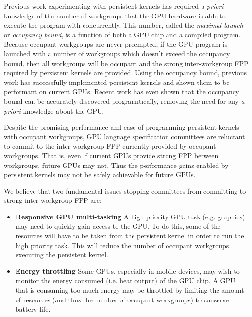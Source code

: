 \documentclass[nocopyrightspace]{sigplanconf-pldi16}
\begin{document}
Previous work experimenting with persistent kernels has required
\emph{a priori} knowledge of the number of workgroups that the GPU
hardware is able to execute the program with concurrently. This
number, called the \emph{maximal launch} or \emph{occupancy bound}, is
a function of both a GPU chip and a compiled program. Because occupant
workgroups are never preempted, if the GPU program is launched with a
number of workgroups which doesn't exceed the occupancy bound, then
all workgroups will be occupant and the strong inter-workgroup FPP
required by persistent kernels are provided. Using the occupancy
bound, previous work has successfully implemented persistent kernels
and shown them to be performant on current GPUs. Recent work has even
shown that the occupancy bound can be accurately discovered
programitically, removing the need for any \emph{a priori} knowledge
about the GPU.

Despite the promising performance and ease of programming persistent
kernels with occupant workgroups, GPU language specification
committees are reluctant to commit to the inter-workgroup FPP
currently provided by occupant workgroups. That is, even if current
GPUs provide strong FPP between workgroups, future GPUs may not. Thus
the performance gains enabled by persistent kernels may not be
safely achievable for future GPUs.

We believe that two fundamental issues stopping committees from
committing to strong inter-workgroup FPP are:

\begin{itemize}
\item {\bf Responsive GPU multi-tasking} A high priority GPU task
  (e.g. graphics) may need to quickly gain access to the GPU. To do
  this, some of the resources will have to be taken from the
  persistent kernel in order to run the high priority task. This will
  reduce the number of occupant workgroups executing the persistent
  kernel.

\item {\bf Energy throttling} Some GPUs, especially in mobile devices,
  may wish to monitor the energy consumed (i.e. heat output) of the
  GPU chip.  A GPU that is consuming too much energy may be throttled
  by limiting the amount of resources (and thus the number of occupant
  workgroups) to conserve battery life.
\end{itemize}
\end{document}
